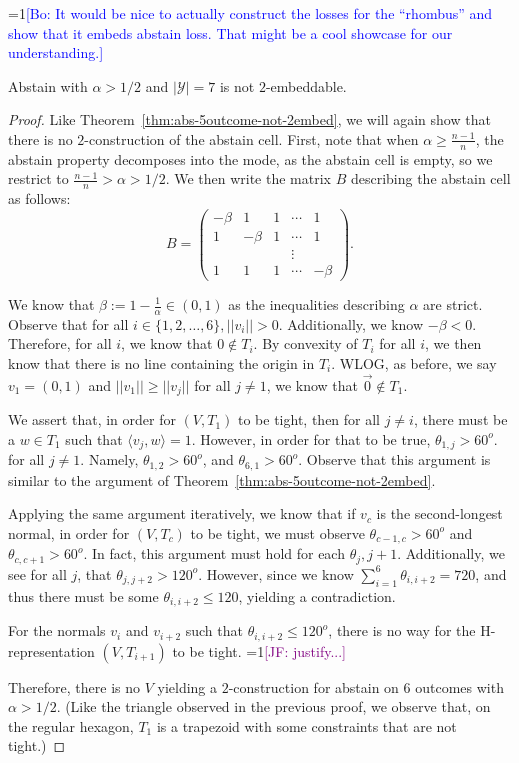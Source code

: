 \documentclass[anon,12pt]{colt2019}
\newcommand{\Comments}{1}
\newcommand{\mynote}[2]{\ifnum\Comments=1\textcolor{#1}{#2}\fi}
\newcommand{\jessie}[1]{\mynote{purple}{[JF: #1]}}
\newcommand{\bo}[1]{\mynote{blue}{[Bo: #1]}}
\newcommand{\Y}{\mathcal{Y}}
\newcommand{\inprod}[2]{\langle #1, #2 \rangle}%
\begin{document}
\bo{It would be nice to actually construct the losses for the ``rhombus'' and show that it embeds abstain loss. That might be a cool showcase for our understanding.}

\begin{theorem}
  Abstain with $\alpha > 1/2$ and $|\Y|=7$ is not $2$-embeddable.
\end{theorem}
\begin{proof}
  Like Theorem~\ref{thm:abs-5outcome-not-2embed}, we will again show that there is no $2$-construction of the abstain cell.
  First, note that when $\alpha \geq \frac{n-1}{n}$, the abstain property decomposes into the mode, as the abstain cell is empty, so we restrict to $\frac{n-1}{n} > \alpha > 1/2$.
  We then write the matrix $B$ describing the abstain cell as follows:
	\[ B = \begin{pmatrix}
       -\beta &  1 &  1 & \cdots & 1  \\
       1  & -\beta &  1 & \cdots & 1  \\
          &    &    & \vdots &    \\
       1  &  1 &  1 & \cdots & -\beta
     \end{pmatrix} .
  \]

  We know that $\beta := 1 - \frac{1}{\alpha} \in (0,1)$ as the inequalities describing $\alpha$ are strict.
  Observe that for all $i \in \{1,2, \ldots, 6\}, ||v_i|| > 0$.
  Additionally, we know $-\beta < 0$.
  Therefore, for all $i$, we know that $0 \not \in T_i$.
  By convexity of $T_i$ for all $i$, we then know that there is no line containing the origin in $T_i$.
  WLOG, as before, we say $v_1 = (0,1)$ and $||v_1|| \geq ||v_j||$ for all $j \neq 1$, we know that $\vec{0} \not \in T_1$.

  We assert that, in order for $(V, T_1)$ to be tight, then for all $j \neq i$, there must be a $w \in T_1$ such that $\inprod{v_j}{w} = 1$.
  However, in order for that to be true, $\theta_{1,j} > 60^o$. for all $j \neq 1$.
  Namely, $\theta_{1,2} > 60^o$, and $\theta_{6,1} > 60^o$.
  Observe that this argument is similar to the argument of Theorem~\ref{thm:abs-5outcome-not-2embed}.

  Applying the same argument iteratively, we know that if $v_c$ is the second-longest normal, in order for $(V, T_c)$ to be tight, we must observe $\theta_{c-1, c} > 60^o$ and $\theta_{c,c+1} > 60^o$.
  In fact, this argument must hold for each $\theta_j, j+1$.
  Additionally, we see for all $j$, that $\theta_{j,j+2} > 120^o$.
  However, since we know $\sum_{i=1}^6 \theta_{i,i+2} = 720$, and thus there must be some $\theta_{i,i+2} \leq 120$, yielding a contradiction.

  For the normals $v_i$ and $v_{i+2}$ such that $\theta_{i,i+2} \leq 120^o$, there is no way for the H-representation $(V, T_{i+1})$ to be tight. \jessie{justify...}

  Therefore, there is no $V$ yielding a $2$-construction for abstain on $6$ outcomes with $\alpha > 1/2$.
  (Like the triangle observed in the previous proof, we observe that, on the regular hexagon, $T_1$ is a trapezoid with some constraints that are not tight.)
\end{proof}
\end{document}
